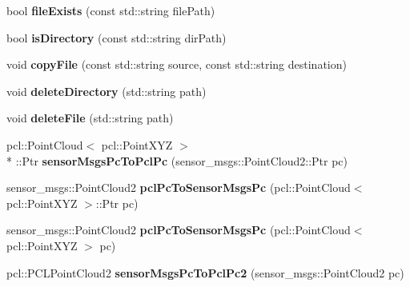 \begin{DoxyCompactItemize}
\item 
\hypertarget{namespacekukadu_acea96b38a689bb37e60bf5b2b1d8c647}{bool {\bfseries file\-Exists} (const std\-::string file\-Path)}\label{namespacekukadu_acea96b38a689bb37e60bf5b2b1d8c647}

\item 
\hypertarget{namespacekukadu_a38a6347a1a0d304a8d45a9d4889b53c1}{bool {\bfseries is\-Directory} (const std\-::string dir\-Path)}\label{namespacekukadu_a38a6347a1a0d304a8d45a9d4889b53c1}

\item 
\hypertarget{namespacekukadu_a6a9de076b50575d26267cb848d76bc63}{void {\bfseries copy\-File} (const std\-::string source, const std\-::string destination)}\label{namespacekukadu_a6a9de076b50575d26267cb848d76bc63}

\item 
\hypertarget{namespacekukadu_abfc9dfeb9dd1af314816fbaca89bc25d}{void {\bfseries delete\-Directory} (std\-::string path)}\label{namespacekukadu_abfc9dfeb9dd1af314816fbaca89bc25d}

\item 
\hypertarget{namespacekukadu_a13aab802ace83e2d78679d3a2a94fbff}{void {\bfseries delete\-File} (std\-::string path)}\label{namespacekukadu_a13aab802ace83e2d78679d3a2a94fbff}

\item 
\hypertarget{namespacekukadu_a01fe6b369ac376f93e351b557ca063c9}{pcl\-::\-Point\-Cloud$<$ pcl\-::\-Point\-X\-Y\-Z $>$\\*
\-::Ptr {\bfseries sensor\-Msgs\-Pc\-To\-Pcl\-Pc} (sensor\-\_\-msgs\-::\-Point\-Cloud2\-::\-Ptr pc)}\label{namespacekukadu_a01fe6b369ac376f93e351b557ca063c9}

\item 
\hypertarget{namespacekukadu_a74b71ae04f8ed25e3613a98a66247683}{sensor\-\_\-msgs\-::\-Point\-Cloud2 {\bfseries pcl\-Pc\-To\-Sensor\-Msgs\-Pc} (pcl\-::\-Point\-Cloud$<$ pcl\-::\-Point\-X\-Y\-Z $>$\-::Ptr pc)}\label{namespacekukadu_a74b71ae04f8ed25e3613a98a66247683}

\item 
\hypertarget{namespacekukadu_aac131ec085769630ebda9ae56193e2ef}{sensor\-\_\-msgs\-::\-Point\-Cloud2 {\bfseries pcl\-Pc\-To\-Sensor\-Msgs\-Pc} (pcl\-::\-Point\-Cloud$<$ pcl\-::\-Point\-X\-Y\-Z $>$ pc)}\label{namespacekukadu_aac131ec085769630ebda9ae56193e2ef}

\item 
\hypertarget{namespacekukadu_af44134c546de6ea5e498b083b8c131bc}{pcl\-::\-P\-C\-L\-Point\-Cloud2 {\bfseries sensor\-Msgs\-Pc\-To\-Pcl\-Pc2} (sensor\-\_\-msgs\-::\-Point\-Cloud2 pc)}\label{namespacekukadu_af44134c546de6ea5e498b083b8c131bc}


\end{DoxyCompactItemize}
